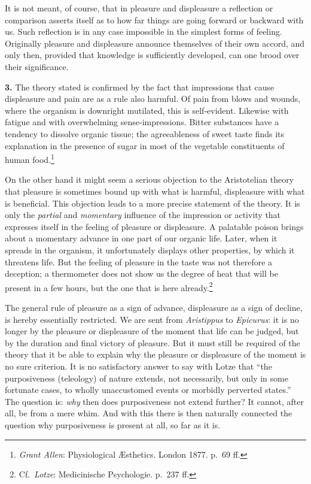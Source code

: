 \documentclass[12pt,a4paper]{book}
\newcommand{\opage}[1]{\marginnote{\footnotesize\textit{[#1]}}}
\begin{document}
It is not meant, of course, that in pleasure and displeasure a
reflection or comparison asserts itself as to how far things are going
forward or backward with us. Such reflection is in any case impossible
in the simplest forms of feeling. Originally pleasure and displeasure
announce themselves of their own accord, and only then, provided that
knowledge is sufficiently developed, can one brood over their
significance.

\textbf{3.} The theory stated is confirmed by the fact that impressions
that cause displeasure and pain are as a rule also harmful. Of pain from
blows and wounds, where the organism is downright mutilated, this is
self-evident. Likewise with fatigue and with overwhelming
sense-impressions. Bitter substances have a tendency to dissolve organic
tissue; the agreeableness of sweet taste finds its explanation in the
presence of sugar in most of the vegetable constituents of human
food.\footnote{\emph{Grant Allen}: Physiological Æsthetics. London 1877.
p.~69 ff.}

\opage{324}On the other hand it might seem a serious objection to the
Aristotelian theory that pleasure is sometimes bound up with what is
harmful, displeasure with what is beneficial. This objection leads to a
more precise statement of the theory. It is only the \emph{partial} and
\emph{momentary} influence of the impression or activity that expresses
itself in the feeling of pleasure or displeasure. A palatable poison
brings about a momentary advance in one part of our organic life. Later,
when it spreads in the organism, it unfortunately displays other
properties, by which it threatens life. But the feeling of pleasure in
the taste was not therefore a deception; a thermometer does not show us
the degree of heat that will be present in a few hours, but the one that
is here already.\footnote{Cf.\ \emph{Lotze}: Medicinische Psychologie.
p.~237 ff.}

The general rule of pleasure as a sign of advance, displeasure as a sign
of decline, is hereby essentially restricted. We are sent from
\emph{Aristippus} to \emph{Epicurus}: it is no longer by the pleasure or
displeasure of the moment that life can be judged, but by the duration
and final victory of pleasure. But it must still be required of the
theory that it be able to explain why the pleasure or displeasure of the
moment is no sure criterion. It is no satisfactory answer to say with
Lotze that ``the purposiveness (teleology) of nature extends, not
necessarily, but only in some fortunate cases, to wholly unaccustomed
events or morbidly perverted states.'' The question is: \emph{why} then
does purposiveness not extend further? It cannot, after all, be from a
mere whim. And with this there is then naturally connected the question
why purposiveness is present at all, so far as it is.
\end{document}
